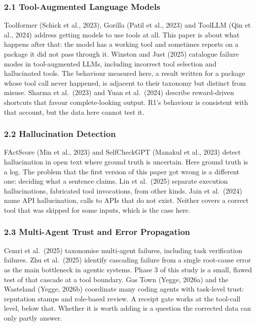 \documentclass[
]{article}
\begin{document}
\subsubsection{2.1 Tool-Augmented Language
Models}\label{tool-augmented-language-models}

Toolformer (Schick et al., 2023), Gorilla (Patil et al., 2023) and
ToolLLM (Qin et al., 2024) address getting models to use tools at all.
This paper is about what happens after that: the model has a working
tool and sometimes reports on a package it did not pass through it.
Winston and Just (2025) catalogue failure modes in tool-augmented LLMs,
including incorrect tool selection and hallucinated tools. The behaviour
measured here, a result written for a package whose tool call never
happened, is adjacent to their taxonomy but distinct from misuse. Sharma
et al.~(2023) and Yuan et al.~(2024) describe reward-driven shortcuts
that favour complete-looking output. R1's behaviour is consistent with
that account, but the data here cannot test it.

\subsubsection{2.2 Hallucination
Detection}\label{hallucination-detection}

FActScore (Min et al., 2023) and SelfCheckGPT (Manakul et al., 2023)
detect hallucination in open text where ground truth is uncertain. Here
ground truth is a log. The problem that the first version of this paper
got wrong is a different one: deciding what a sentence claims. Lin et
al.~(2025) separate execution hallucinations, fabricated tool
invocations, from other kinds. Jain et al.~(2024) name API
hallucination, calls to APIs that do not exist. Neither covers a correct
tool that was skipped for some inputs, which is the case here.

\subsubsection{2.3 Multi-Agent Trust and Error
Propagation}\label{multi-agent-trust-and-error-propagation}

Cemri et al.~(2025) taxonomise multi-agent failures, including task
verification failures. Zhu et al.~(2025) identify cascading failure from
a single root-cause error as the main bottleneck in agentic systems.
Phase 3 of this study is a small, flawed test of that cascade at a tool
boundary. Gas Town (Yegge, 2026a) and the Wasteland (Yegge, 2026b)
coordinate many coding agents with task-level trust: reputation stamps
and role-based review. A receipt gate works at the tool-call level,
below that. Whether it is worth adding is a question the corrected data
can only partly answer.
\end{document}
